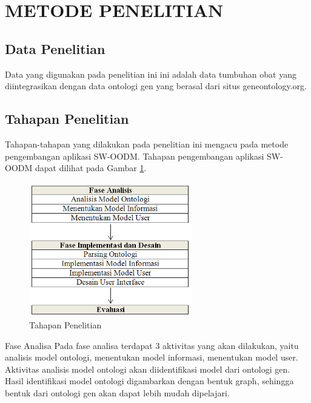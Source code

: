\section*{METODE PENELITIAN}

\subsection*{Data Penelitian}

Data yang digunakan pada penelitian ini ini adalah data tumbuhan obat yang diintegrasikan dengan data ontologi gen yang berasal dari situs geneontology.org.

\subsection*{Tahapan Penelitian}

Tahapan-tahapan yang dilakukan pada penelitian ini mengacu pada metode pengembangan aplikasi SW-OODM. Tahapan pengembangan aplikasi SW-OODM dapat dilihat pada Gambar \ref{fig:tahapan_penelitian}.

\begin{figure}[h!] %
	\centering
	\includegraphics[width=200pt]{kolokium_tahapan_penelitian_gb2.png}
	\caption{Tahapan Penelitian}
	\label{fig:tahapan_penelitian}
\end{figure}

Fase Analisa
Pada fase analisa terdapat 3 aktivitas yang akan dilakukan, yaitu analisis model ontologi, menentukan model informasi, menentukan model user. Aktivitas analisis model ontologi akan diidentifikasi model dari ontologi gen. Hasil identifikasi model ontologi digambarkan dengan bentuk graph, sehingga bentuk dari ontologi gen akan dapat lebih mudah dipelajari.

